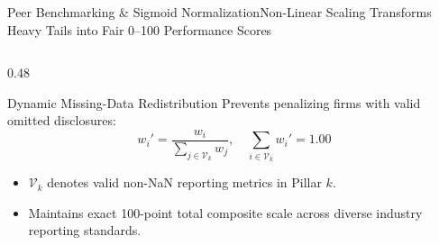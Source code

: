 \begin{frame}{Peer Benchmarking \& Sigmoid Normalization}{Non-Linear Scaling Transforms Heavy Tails into Fair 0--100 Performance Scores}
\begin{columns}[T]
\begin{column}{0.48\textwidth}
            \begin{quantcard}[height=2.75cm]{Dynamic Missing-Data Redistribution}
                \fontsize{6.3pt}{7.9pt}\selectfont
                Prevents penalizing firms with valid omitted disclosures:
                \begin{equation*}
                    w_i' = \frac{w_i}{\sum_{j \in \mathcal{V}_k} w_j}, \quad \sum_{i \in \mathcal{V}_k} w_i' = 1.00
                \end{equation*}
                \begin{itemize}
                    \setlength{\itemsep}{1pt}
                    \item $\mathcal{V}_k$ denotes valid non-NaN reporting metrics in Pillar $k$.
                    \item Maintains exact 100-point total composite scale across diverse industry reporting standards.
                \end{itemize}
            \end{quantcard}
        \end{column}
    \end{columns}

    \vspace{0.1cm}
    \hfill {}
\end{frame}
